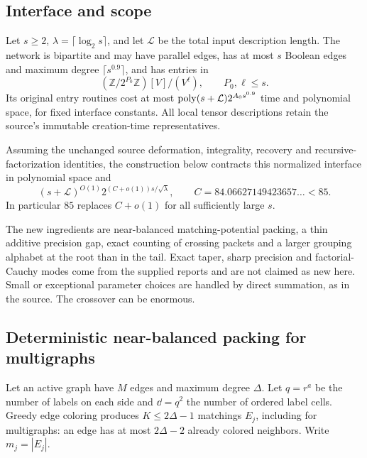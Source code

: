 \subsection{Interface and scope}
Let $s\ge2$, $\lambda=\lceil\log_2s\rceil$, and let $\mathcal L$ be the total
input description length. The network is bipartite and may have parallel edges, has at most
$s$ Boolean edges and maximum degree $\lceil s^{0.9}\rceil$, and has entries in
\[
 (\mathbb Z/2^{P_0}\mathbb Z)[V]/(V^\ell),\qquad P_0,\ell\le s.
\]
Its original entry routines cost at most $\operatorname{poly}(s+\mathcal L)2^{A_0s^{0.9}}$ time
and polynomial space, for fixed interface constants. All local tensor descriptions retain
the source's immutable creation-time representatives.

\begin{theorem}\label{thm:85}
Assuming the unchanged source deformation, integrality, recovery and recursive-factorization
identities, the construction below contracts this normalized interface in polynomial space and
\[
 (s+\mathcal L)^{O(1)}
 2^{(C+o(1))s/\sqrt\lambda},\qquad C=84.06627149423657\ldots<85.
\]
In particular $85$ replaces $C+o(1)$ for all sufficiently large $s$.
\end{theorem}
The new ingredients are near-balanced matching-potential packing, a thin additive precision
gap, exact counting of crossing packets and a larger grouping alphabet at the root than in
the tail. Exact taper, sharp precision and factorial-Cauchy modes come from the supplied
reports and are not claimed as new here. Small or exceptional parameter choices are handled
by direct summation, as in the source. The crossover can be enormous.

\subsection{Deterministic near-balanced packing for multigraphs}
Let an active graph have $M$ edges and maximum degree $\Delta$.
Let $q=r^a$ be the number of labels on each side and $\dd=q^2$ the number of ordered
label cells. Greedy edge coloring produces $K\le2\Delta-1$ matchings $E_j$,
including for multigraphs: an edge has at most $2\Delta-2$ already colored neighbors.
Write $m_j=|E_j|$.

